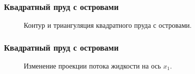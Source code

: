 \documentclass[10pt,utf8,presentation,compress]{beamer}
\begin{document}
\begin{frame}
\frametitle{Квадратный пруд с островами}
	\begin{figure}[H]
		\centering
		\hfill
		\caption{Контур и триангуляция квадратного пруда с островами.}
	\end{figure}
\end{frame}

\begin{frame}
\frametitle{Квадратный пруд с островами}
	\begin{figure}[H]
		\centering
		\hfill
		\caption{Изменение проекции потока жидкости на ось $x_1$.}
		\end{figure}
\end{frame}
\end{document}
